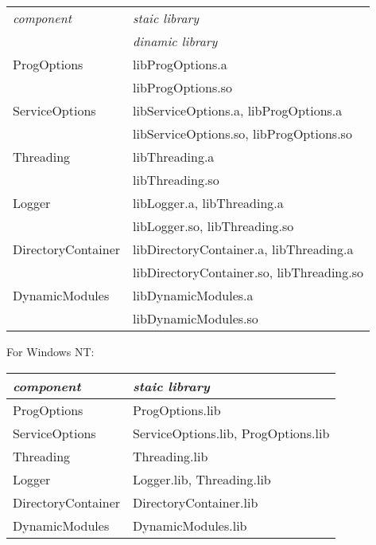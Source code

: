 \documentclass[10pt]{article}
\begin{document}
\begin{tabular}{|l|l|}\hline

  {\em component}
& {\em staic library} \\ \cline{2-2}
& {\em dinamic library} \\ \hline

  ProgOptions
& libProgOptions.a \\ \cline{2-2}
& libProgOptions.so \\ \hline

  ServiceOptions
& libServiceOptions.a, libProgOptions.a \\ \cline{2-2}
& libServiceOptions.so, libProgOptions.so \\ \hline    

  Threading
& libThreading.a \\ \cline{2-2}
& libThreading.so \\ \hline

  Logger
& libLogger.a, libThreading.a  \\ \cline{2-2}
& libLogger.so, libThreading.so \\ \hline

  DirectoryContainer
& libDirectoryContainer.a, libThreading.a  \\ \cline{2-2}
& libDirectoryContainer.so, libThreading.so \\ \hline

  DynamicModules
& libDynamicModules.a  \\ \cline{2-2}
& libDynamicModules.so \\ \hline

\end{tabular}
\newline
\newline
\newline
 For Windows NT:
\newline

\begin{tabular}{|l|l|}\hline

  {\em component}
& {\em staic library}\\ \hline

  ProgOptions
& ProgOptions.lib \\ \hline

  ServiceOptions
& ServiceOptions.lib, ProgOptions.lib \\ \hline    

  Threading
& Threading.lib \\ \hline

  Logger
& Logger.lib, Threading.lib \\ \hline

  DirectoryContainer
& DirectoryContainer.lib \\ \hline

  DynamicModules
& DynamicModules.lib \\ \hline

\end{tabular}
\newline
\newline
\end{document}
